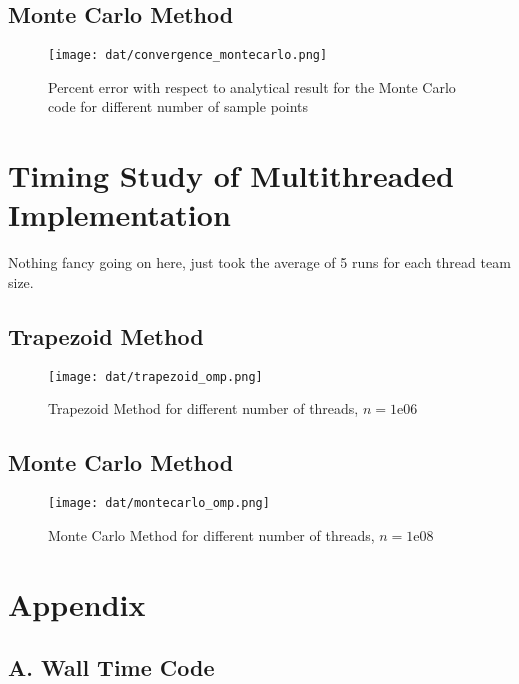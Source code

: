 \documentclass[a4paper]{article}
\newenvironment{code}{\captionsetup{type=listing}}{}
\begin{document}
    \subsection*{Monte Carlo Method}
    \begin{figure}[!h]
        \centering
        \texttt{[image: dat/convergence\_montecarlo.png]}
        \caption{Percent error with respect to analytical result for the Monte Carlo code for different number of sample points}
        \label{fig:dat-convergence_montecarlo-png}
    \end{figure}

    \pagebreak

    \section{Timing Study of Multithreaded Implementation}
    Nothing fancy going on here, just took the
    average of 5 runs for each thread team size.
    \subsection*{Trapezoid Method}
    \begin{figure}[!h]
        \centering
        \texttt{[image: dat/trapezoid\_omp.png]}
        \caption{Trapezoid Method for different number of threads, $n = 1\text{e}06$}
        \label{fig:dat-}
    \end{figure}

    \subsection*{Monte Carlo Method}

    \begin{figure}[!h]
        \centering
        \texttt{[image: dat/montecarlo\_omp.png]}
        \caption{Monte Carlo Method for different number of threads, $n = 1\text{e}08$}
        \label{fig:dat-montecarlo_omp-png}
    \end{figure}


\section*{Appendix}
\subsection*{A. Wall Time Code}
\begin{code}
\inputminted[samepage=false, breaklines]{c}{src/timer.c}
\label{lst:timer_src}
\caption{timer.c}
\end{code}      
\end{document}

